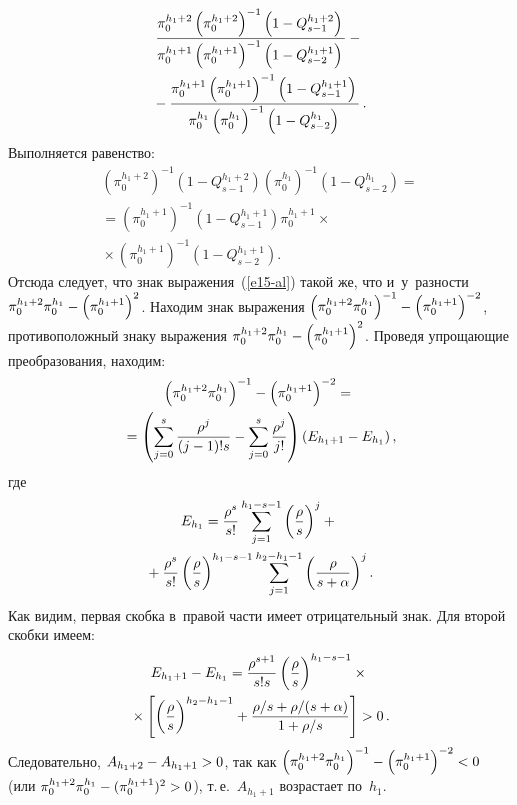 \begin{multicols}{2}
\noindent
  \begin{multline}
  \displaystyle\frac{\displaystyle \pi_0^{h_1+2} \left( \pi_0^{h_1+2}\right)^{-1} \left( 1-Q_{s-1}^{h_1+2}\right)\mathstrut}{\displaystyle \pi_0^{h_1+1} \left( \pi_0^{h_1+1}\right)^{-1} \left( 1-Q_{s-2}^{h_1+1}\right)\mathstrut} -{}\\
  {}-
\displaystyle\frac{\displaystyle \pi_0^{h_1+1} \left( \pi_0^{h_1+1}\right)^{-1} \left(1- Q_{s-1}^{h_1+1}\right) \mathstrut}{\displaystyle \pi_0^{h_1}\left( \pi_0^{h_1}\right)^{-1} \left( 1-Q^{h_1}_{s-2}\right)\mathstrut}\,.
  \label{e15-al}
  \end{multline}
  Выполняется равенство:
  \begin{multline*}
  \left(\pi_0^{h_1+2}\right)^{-1} \left( 1-Q_{s-1}^{h_1+2}\right) 
\left(\pi_0^{h_1}\right)^{-1} \left( 1-Q_{s-2}^{h_1}\right)={}\\
  {}= \left(\pi_0^{h_1+1}\right)^{-1} \left( 1-Q_{s-1}^{h_1+1}\right) 
\pi_0^{h_1+1} \times{}\\
{}\times \left(\pi_0^{h_1+1}\right)^{-1} \left( 1- Q_{s-2}^{h_1+1}\right).
  \end{multline*}
  Отсюда следует, что знак выражения~(\ref{e15-al}) такой же, что 
и~у~раз\-ности $\pi_0^{h_1+2} \pi_0^{h_1}\hm-\left(\pi_0^{h_1+1}\right)^{2}$. 
Находим знак выражения $\left( \pi_0^{h_1+2} \pi_0^{h_1}\right)^{-1} \hm- \left( 
\pi_0^{h_1+1}\right)^{-2}$, противоположный знаку выражения $\pi_0^{h_1+2} 
\pi_0^{h_1} \hm- \left( \pi_0^{h_1+1}\right)^2$. Проведя упро\-ща\-ющие 
преобразования, находим:
  \begin{multline*}
  \left( \pi_0^{h_1+2} \pi_0^{h_1}\right)^{-1} -\left( \pi_0^{h_1+1}\right)^{-2} 
={}\\
  {}= \left( \sum\limits_{j=0}^s \displaystyle\frac{\displaystyle \rho^j\mathstrut}{\displaystyle (j-1)!s\mathstrut} -\sum\limits_{j=0}^s 
\displaystyle\frac{\displaystyle \rho^j\mathstrut}{\displaystyle j!\mathstrut} \right) \left( E_{h_1+1}- E_{h_1}\right),
  \end{multline*}
где 
\begin{multline*}
E_{h_1}= \displaystyle\frac{\displaystyle \rho^s\mathstrut}{\displaystyle s!\mathstrut} \sum\limits_{j=1}^{h_1-s-1} \left(\displaystyle\frac{\displaystyle \rho\mathstrut}{\displaystyle s\mathstrut}\right)^j +{}\\
{}+ \displaystyle\frac{\displaystyle \rho^s\mathstrut}{\displaystyle s!\mathstrut}  
\left(\displaystyle\frac{\displaystyle \rho\mathstrut}{\displaystyle s\mathstrut}\right)^{h_1-s-1} \sum\limits_{j=1}^{h_2-h_1-1} \left(\displaystyle\frac{\displaystyle \rho\mathstrut}{\displaystyle s+\alpha\mathstrut}\right)^j.
\end{multline*}
%
Как видим, первая скобка в~правой час\-ти имеет отрицательный знак. Для 
второй скоб\-ки имеем:
\begin{multline*}
E_{h_1+1} -E_{h_1} = \displaystyle\frac{\displaystyle \rho^{s+1}\mathstrut}{\displaystyle s!s\mathstrut}\left( \displaystyle\frac{\displaystyle \rho\mathstrut}{\displaystyle s\mathstrut}\right)^{h_1-s-1}\times{}\\
{}\times \left[
\left(\displaystyle\frac{\displaystyle \rho\mathstrut}{\displaystyle s\mathstrut}\right)^{h_2-h_1-1} +\displaystyle\frac{\displaystyle \rho/s+\rho/(s+\alpha)\mathstrut}{\displaystyle 1+\rho/s\mathstrut}\right] 
>0\,.
\end{multline*}
Следовательно, $A_{h_1+2}\hm- A_{h_1+1}\hm>0$, так как $\left( 
\pi_0^{h_1+2} \pi_0^{h_1}\right)^{-1} \hm- \left( \pi_0^{h_1+1}
\right)^{-2}\hm<0$ (или $\pi_0^{h_1+2} \pi_0^{h_1} \hm- 
(\pi_0^{h_1+1})^2\hm>0$), т.\,е.\ $A_{h_1+1}$ возрастает по~$h_1$.
   

\end{multicols}
